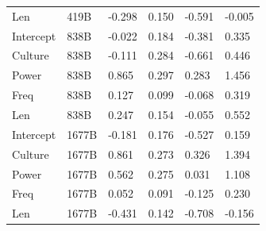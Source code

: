 \documentclass[
  10pt,
  nohyperref]{acl}
\begin{document}
\begin{longtable}[]{@{}llllll@{}}
Len & 419B & -0.298 & 0.150 & -0.591 & -0.005 \\
Intercept & 838B & -0.022 & 0.184 & -0.381 & 0.335 \\
Culture & 838B & -0.111 & 0.284 & -0.661 & 0.446 \\
Power & 838B & 0.865 & 0.297 & 0.283 & 1.456 \\
Freq & 838B & 0.127 & 0.099 & -0.068 & 0.319 \\
Len & 838B & 0.247 & 0.154 & -0.055 & 0.552 \\
Intercept & 1677B & -0.181 & 0.176 & -0.527 & 0.159 \\
Culture & 1677B & 0.861 & 0.273 & 0.326 & 1.394 \\
Power & 1677B & 0.562 & 0.275 & 0.031 & 1.108 \\
Freq & 1677B & 0.052 & 0.091 & -0.125 & 0.230 \\
Len & 1677B & -0.431 & 0.142 & -0.708 & -0.156 \\

\end{longtable}
\end{document}
